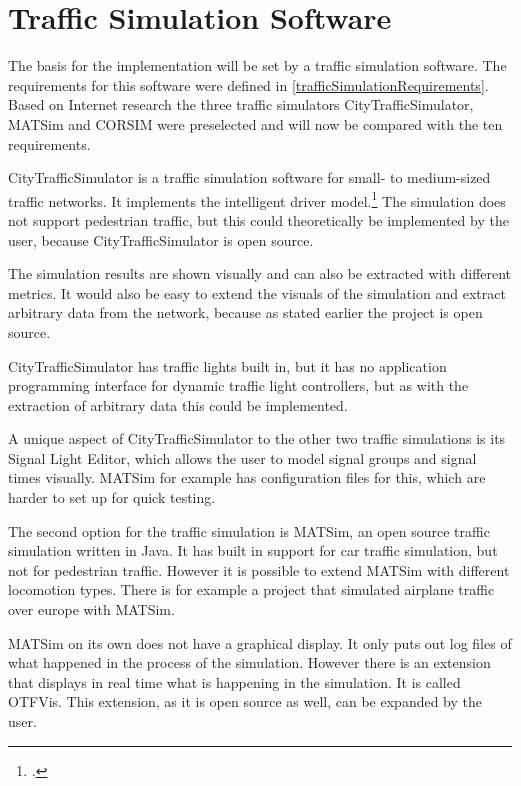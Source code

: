 \section{Traffic Simulation Software}

The basis for the implementation will be set by a traffic simulation software. The requirements for this software were defined in \ref{trafficSimulationRequirements}. Based on Internet research the three traffic simulators CityTrafficSimulator, MATSim and CORSIM were preselected and will now be compared with the ten requirements.

CityTrafficSimulator is a traffic simulation software for small- to medium-sized traffic networks. It implements the intelligent driver model.\footcite{citation needed (traffic-simulation.de)} The simulation does not support pedestrian traffic, but this could theoretically be implemented by the user, because CityTrafficSimulator is open source.

The simulation results are shown visually and can also be extracted with different metrics. It would also be easy to extend the visuals of the simulation and extract arbitrary data from the network, because as stated earlier the project is open source.

CityTrafficSimulator has traffic lights built in, but it has no application programming interface for dynamic traffic light controllers, but as with the extraction of arbitrary data this could be implemented.

A unique aspect of CityTrafficSimulator to the other two traffic simulations is its Signal Light Editor, which allows the user to model signal groups and signal times visually. MATSim for example has configuration files for this, which are harder to set up for quick testing.

The second option for the traffic simulation is MATSim, an open source traffic simulation written in Java. It has built in support for car traffic simulation, but not for pedestrian traffic. However it is possible to extend MATSim with different locomotion types. There is for example a project that simulated airplane traffic over europe with MATSim.

MATSim on its own does not have a graphical display. It only puts out log files of what happened in the process of the simulation. However there is an extension that displays in real time what is happening in the simulation. It is called OTFVis. This extension, as it is open source as well, can be expanded by the user.

